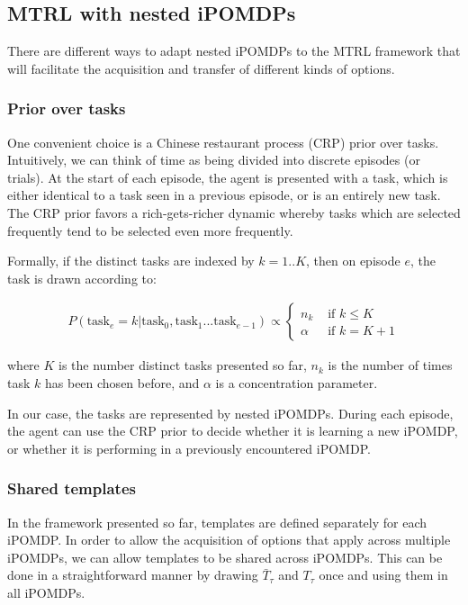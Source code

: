 \documentclass[11pt]{article}
\begin{document}
\subsection{MTRL with nested iPOMDPs}

There are different ways to adapt nested iPOMDPs to the MTRL framework that will facilitate the acquisition and transfer of different kinds of options.

\subsubsection{Prior over tasks}

One convenient choice is a Chinese restaurant process (CRP) \cite{Teh2006} prior over tasks. Intuitively, we can think of time as being divided into discrete episodes (or trials). At the start of each episode, the agent is presented with a task, which is either identical to a task seen in a previous episode, or is an entirely new task. The CRP prior favors a rich-gets-richer dynamic whereby tasks which are selected frequently tend to be selected even more frequently.

Formally, if the distinct tasks are indexed by $k = 1..K$, then on episode $e$, the task is drawn according to: 

\begin{align*}
P(\text{task}_e = k | \text{task}_0, \text{task}_1 ... \text{task}_{e-1} ) \propto \begin{cases}  n_k  & \text{ if } k \le K \\ \alpha & \text{ if } k = K + 1\end{cases}
\end{align*}

where $K$ is the number distinct tasks presented so far, $n_k$ is the number of times task $k$ has been chosen before, and $\alpha$ is a concentration parameter.

In our case, the tasks are represented by nested iPOMDPs. During each episode, the agent can use the CRP prior to decide whether it is learning a new iPOMDP, or whether it is performing in a previously encountered iPOMDP.

\subsubsection{Shared templates}

In the framework presented so far, templates are defined separately for each iPOMDP. In order to allow the acquisition of options that apply across multiple iPOMDPs, we can allow templates to be shared across iPOMDPs. This can be done in a straightforward manner by drawing $\bar{T}_\tau$ and $T_\tau$ once and using them in all iPOMDPs. 
\end{document}
